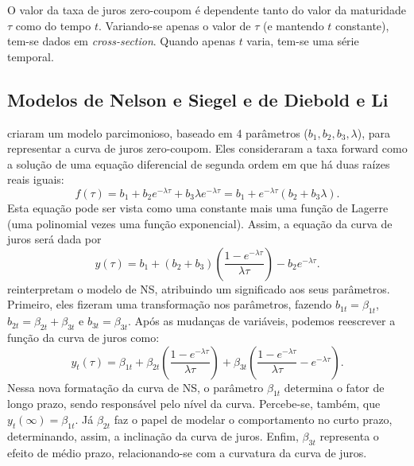 \documentclass[
	12pt,				%
	openright,			%
	oneside,			%
	a4paper,			%
	english,			%
	brazil				%
	]{dissertacao-ufrgs-abntex2}
\begin{document}
O valor da taxa de juros zero-coupom é dependente tanto do valor da maturidade $\tau$ como do tempo $t$. 
Variando-se apenas o valor de $\tau$ (e mantendo $t$ constante),
tem-se dados em \emph{cross-section}. Quando apenas $t$ varia, tem-se
uma série temporal.





\subsection{Modelos de Nelson e Siegel e de Diebold e Li}

 criaram um modelo parcimonioso, baseado em 4 parâmetros
($b_{1},b_{2},b_{3},\lambda$), para representar a curva de juros
zero-coupom. Eles consideraram a taxa forward como a solução de uma
equação diferencial de segunda ordem em que há duas raízes reais iguais:
\begin{equation}
f(\tau)=b_{1}+b_{2}e^{-\lambda\tau}+b_{3}\lambda e^{-\lambda\tau}=b_1+e^{-\lambda \tau}(b_2+b_3 \lambda).
\end{equation}
Esta equação pode ser vista como uma constante mais uma função de
Lagerre (uma polinomial vezes uma função exponencial). Assim, a equação
da curva de juros será dada por
\begin{equation}
y(\tau)=b_{1}+(b_{2}+b_{3})\left(\frac{1-e^{-\lambda\tau}}{\lambda\tau}\right)-b_{2}e^{-\lambda\tau}.
\end{equation}
 reinterpretam o modelo de NS, atribuindo um significado
aos seus parâmetros. Primeiro, eles fizeram uma transformação nos
parâmetros, fazendo $b_{1t}=\beta_{1t}$, $b_{2t}=\beta_{2t}+\beta_{3t}$
e $b_{3t}=\beta_{3t}$. Após as mudanças de variáveis, podemos reescrever a função da curva de juros como:
\begin{equation}
y_t(\tau)=\beta_{1t}+\beta_{2t}\left(\frac{1-e^{-\lambda\tau}}{\lambda\tau}\right)+\beta_{3t}\left(\frac{1-e^{-\lambda\tau}}{\lambda\tau}-e^{-\lambda\tau}\right).
\end{equation}
Nessa nova formatação da curva de NS, o parâmetro $\beta_{1t}$ determina
o fator de longo prazo, sendo responsável pelo nível da curva. Percebe-se,
também, que $y_{t}(\infty)=\beta_{1t}$. Já $\beta_{2t}$ faz o papel
de modelar o comportamento no curto prazo, determinando, assim, a
inclinação da curva de juros. Enfim, $\beta_{3t}$ representa o efeito
de médio prazo, relacionando-se com a curvatura da curva de juros.
\end{document}
